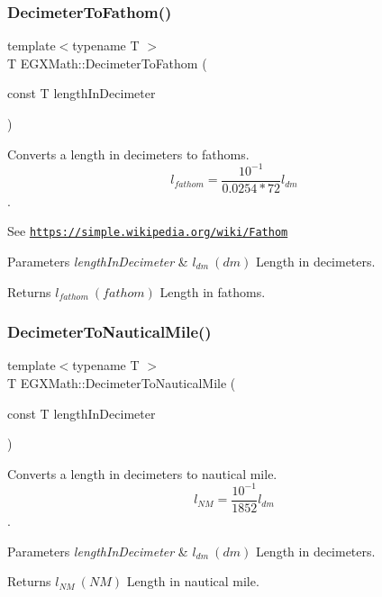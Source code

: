 \subsubsection{\texorpdfstring{Decimeter\+To\+Fathom()}{DecimeterToFathom()}}
{\footnotesize\ttfamily template$<$typename T $>$ \\
T E\+G\+X\+Math\+::\+Decimeter\+To\+Fathom (\begin{DoxyParamCaption}\item[{const T}]{length\+In\+Decimeter }\end{DoxyParamCaption})}



Converts a length in decimeters to fathoms. \[ l_{fathom}= \frac{10^{-1}}{0.0254 * 72} l_{dm} \]. 

See \href{https://simple.wikipedia.org/wiki/Fathom}{\tt https\+://simple.\+wikipedia.\+org/wiki/\+Fathom} 
\begin{DoxyParams}{Parameters}
{\em length\+In\+Decimeter} & $ l_{dm}\ (dm)$ Length in decimeters. \\
\hline
\end{DoxyParams}
\begin{DoxyReturn}{Returns}
$ l_{fathom}\ (fathom)$ Length in fathoms. 
\end{DoxyReturn}
\mbox{\label{group___e_g_x_math-_conversions-_length_conversions-_s_i-_decimeter-_nautical_ga6cc0e9987da30da6a30ddba50971ba2d}} 
\subsubsection{\texorpdfstring{Decimeter\+To\+Nautical\+Mile()}{DecimeterToNauticalMile()}}
{\footnotesize\ttfamily template$<$typename T $>$ \\
T E\+G\+X\+Math\+::\+Decimeter\+To\+Nautical\+Mile (\begin{DoxyParamCaption}\item[{const T}]{length\+In\+Decimeter }\end{DoxyParamCaption})}



Converts a length in decimeters to nautical mile. \[ l_{NM}= \frac{10^{-1}}{1852} l_{dm} \]. 


\begin{DoxyParams}{Parameters}
{\em length\+In\+Decimeter} & $ l_{dm}\ (dm)$ Length in decimeters. \\
\hline
\end{DoxyParams}
\begin{DoxyReturn}{Returns}
$ l_{NM}\ (NM)$ Length in nautical mile. 
\end{DoxyReturn}
